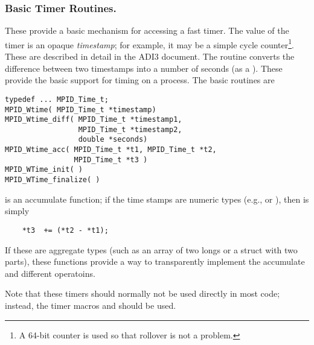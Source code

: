 \documentclass{article}
\begin{document}
\subsubsection{Basic Timer Routines.}
These provide a basic mechanism for accessing a fast timer.  The value of the
timer is an opaque \emph{timestamp}; for example, it may be a simple cycle
counter\footnote{A 64-bit counter is used so that rollover is not a
problem.}.  These 
are described in detail in the ADI3 document. 
The routine  converts the difference
between two timestamps into a number of seconds (as a ).  These
provide the basic support for timing on a process.  The basic routines are

\begin{verbatim}
typedef ... MPID_Time_t;
MPID_Wtime( MPID_Time_t *timestamp)
MPID_Wtime_diff( MPID_Time_t *timestamp1, 
                 MPID_Time_t *timestamp2, 
                 double *seconds)
MPID_Wtime_acc( MPID_Time_t *t1, MPID_Time_t *t2, 
                MPID_Time_t *t3 )
MPID_WTime_init( )
MPID_WTime_finalize( )
\end{verbatim}
 is an accumulate function; if the time stamps are numeric
types (e.g.,  or ), then  is
simply
\begin{verbatim}
    *t3  += (*t2 - *t1);
\end{verbatim}
If these are aggregate types (such as an array of two longs or a
struct with two parts), these functions provide a way to transparently
implement the accumulate and different operatoins.


Note that these timers should normally not be used directly in most
code; instead, 
the timer macros  and
 should be used.  
\end{document}
